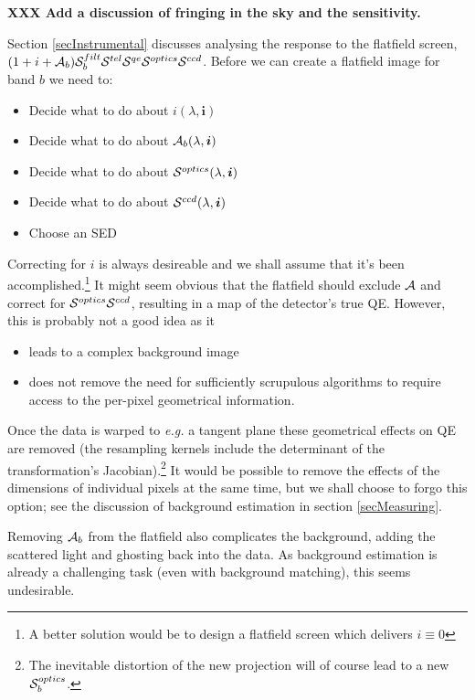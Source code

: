 \documentclass[12pt]{article}
\newcommand{\eg}{\textit{e.g.}\xspace}
\newcommand{\ib}{{\boldsymbol i}}
\newcommand{\additive}{{\cal A}}
\newcommand{\qe}{{\cal S}}
\newcommand{\XXX}[1]{\textbf{XXX #1}\xspace}
\begin{document}
\XXX{Add a discussion of fringing in the sky and the sensitivity.}

Section \ref{secInstrumental} discusses analysing the response to the flatfield screen,
$(1 + i + \additive_b) \qe_b^{filt} \qe^{tel} \qe^{qe} \qe^{optics} \qe^{ccd}$.
Before we can create a flatfield image for band $b$ we need to:
\begin{itemize}
\item Decide what to do about $i(\lambda, \ib)$
\item Decide what to do about $\additive_b(\lambda, \ib)$
\item Decide what to do about $\qe^{optics}(\lambda, \ib)$
\item Decide what to do about $\qe^{ccd}(\lambda, \ib)$
\item Choose an SED
\end{itemize}

Correcting for $i$ is always desireable and we shall assume that it's been accomplished.\footnote{A better
  solution would be to design a flatfield screen which delivers $i \equiv 0$} It might seem obvious that the
flatfield should exclude $\additive$ and correct for $\qe^{optics} \qe^{ccd}$, resulting in a map of the
detector's true QE.  However, this is probably not a good idea as it
\begin{itemize}
\item leads to a complex background image
\item does not remove the need for sufficiently scrupulous algorithms to require access to the per-pixel
  geometrical information.
\end{itemize}

Once the data is warped to \eg a tangent plane these geometrical effects on QE are removed (the resampling
kernels include the determinant of the transformation's Jacobian).\footnote{ The inevitable distortion of the
  new projection will of course lead to a new $\qe^{optics}_b$.  } It would be possible to remove the effects
of the dimensions of individual pixels at the same time, but we shall choose to forgo this option; see the
discussion of background estimation in section \ref{secMeasuring}.

Removing $\additive_b$ from the flatfield also complicates the background, adding the scattered light and ghosting
back into the data.  As background estimation is already a challenging task (even with background matching),
this seems undesirable.
\end{document}
